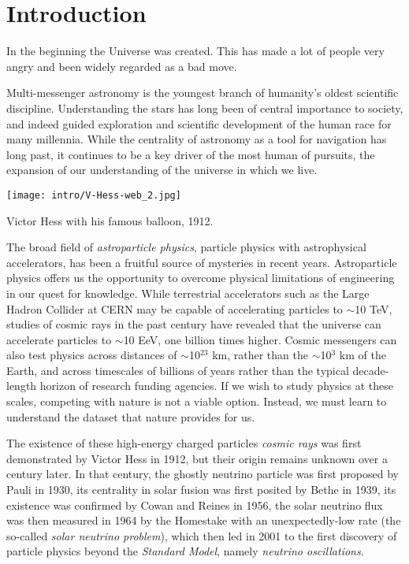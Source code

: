 \setchapterpreamble[u]{\margintoc}
\chapter{Introduction}
\begin{fquote} In the beginning the Universe was created. This has made a lot of people very angry and been widely regarded as a bad move. 
\end{fquote}

Multi-messenger astronomy is the youngest branch of humanity's oldest scientific discipline. Understanding the stars has long been of central importance to society, and indeed guided exploration and scientific development of the human race for many millennia. While the centrality of astronomy as a tool for navigation has long past, it continues to be a key driver of the most human of pursuits, the expansion of our understanding of the universe in which we live. 

\begin{marginfigure}
	\centering \texttt{[image: intro/V-Hess-web\_2.jpg]}
	\caption{Victor Hess with his famous balloon, 1912.}
\end{marginfigure}

The broad field of \emph{astroparticle physics}, particle physics with astrophysical accelerators, has been a fruitful source of mysteries in recent years. Astroparticle physics offers us the opportunity to overcome physical limitations of engineering in our quest for knowledge. While terrestrial accelerators such as the Large Hadron Collider at CERN may be capable of accelerating particles to $\sim$10 TeV, studies of cosmic rays in the past century have revealed that the universe can accelerate particles to $\sim$10 EeV, one billion times higher. Cosmic messengers can also test physics across distances of $\sim$10$^{23}$ km, rather than the $\sim$10$^{3}$ km of the Earth, and across timescales of billions of years rather than the typical decade-length horizon of research funding agencies. If we wish to study physics at these scales, competing with nature is not a viable option. Instead, we must learn to understand the dataset that nature provides for us.

The existence of these high-energy charged particles \emph{cosmic rays} was first demonstrated by Victor Hess in 1912, but their origin remains unknown over a century later. In that century, the ghostly neutrino particle was first proposed by Pauli in 1930, its centrality in solar fusion was first posited by Bethe in 1939, its existence was confirmed by Cowan and Reines in 1956, the solar neutrino flux was then measured in 1964 by the Homestake with an unexpectedly-low rate (the so-called \emph{solar neutrino problem}), which then led in 2001 to the first discovery of particle physics beyond the \emph{Standard Model}, namely \emph{neutrino oscillations}. 

